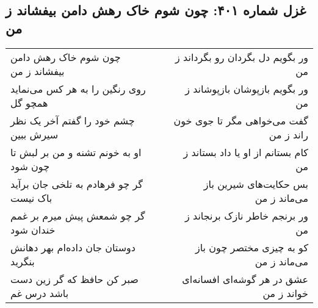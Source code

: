 \begin{center}
\section*{غزل شماره ۴۰۱: چون شوم خاک رهش دامن بیفشاند ز من}
\label{sec:sh401}
\begin{longtable}{l p{0.5cm} r}
چون شوم خاک رهش دامن بیفشاند ز من
&&
ور بگویم دل بگردان رو بگرداند ز من
\\
روی رنگین را به هر کس می‌نماید همچو گل
&&
ور بگویم بازپوشان بازپوشاند ز من
\\
چشم خود را گفتم آخر یک نظر سیرش ببین
&&
گفت می‌خواهی مگر تا جوی خون راند ز من
\\
او به خونم تشنه و من بر لبش تا چون شود
&&
کام بستانم از او یا داد بستاند ز من
\\
گر چو فرهادم به تلخی جان برآید باک نیست
&&
بس حکایت‌های شیرین باز می‌ماند ز من
\\
گر چو شمعش پیش میرم بر غمم خندان شود
&&
ور برنجم خاطر نازک برنجاند ز من
\\
دوستان جان داده‌ام بهر دهانش بنگرید
&&
کو به چیزی مختصر چون باز می‌ماند ز من
\\
صبر کن حافظ که گر زین دست باشد درس غم
&&
عشق در هر گوشه‌ای افسانه‌ای خواند ز من
\\
\end{longtable}
\end{center}
